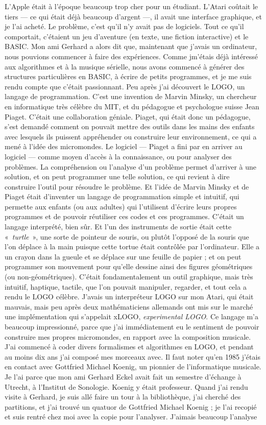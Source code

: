 \documentclass[a4paper,12pt]{article}
\newcommand{\guill}[1]{«~#1~»}
\begin{document}
L'Apple était à l'époque beaucoup trop cher pour un étudiant. L'Atari coûtait le tiers --- ce qui était déjà beaucoup d'argent ---, il avait une interface graphique, et je l'ai acheté. Le problème, c'est qu'il n'y avait pas de logiciels. Tout ce qu'il comportait, c'étaient un jeu d'aventure (en texte, une fiction interactive) et le BASIC. Mon ami Gerhard a alors dit que, maintenant que j'avais un ordinateur, nous pouvions commencer à faire des expériences. Comme jm'étais déjà intéressé aux algorithmes et à la musique sérielle, nous avons commencé à générer des structures particulières en BASIC, à écrire de petits programmes, et je me suis rendu compte que c'était passionnant. Peu après j'ai découvert le LOGO, un langage de programmation. C'est une invention de Marvin Minsky, un chercheur en informatique très célèbre du MIT, et du pédagogue et psychologue suisse Jean Piaget. C'était une collaboration géniale. Piaget, qui était donc un pédagogue, s'est demandé comment on pouvait mettre des outils dans les mains des enfants avec lesquels ils puissent appréhender ou construire leur environnement, ce qui a mené à l'idée des micromondes. Le logiciel --- Piaget a fini par en arriver au logiciel --- comme moyen d'accès à la connaissance, ou pour analyser des problèmes. La compréhension ou l'analyse d'un problème permet d'arriver à une solution, et on peut programmer une telle solution, ce qui revient à dire construire l'outil pour résoudre le problème. Et l'idée de Marvin Minsky et de Piaget était d'inventer un langage de programmation simple et intuitif, qui permette aux enfants (ou aux adultes) qui l'utilisent d'écrire leurs propres programmes et de pouvoir réutiliser ces codes et ces programmes. C'était un langage interprété, bien sûr. Et l'un des instruments de sortie était cette \guill{\emph{turtle}}, une sorte de pointeur de souris, ou plutôt l'opposé de la souris que l'on déplace à la main puisque cette tortue était contrôlée par l'ordinateur. Elle a un crayon dans la gueule et se déplace sur une feuille de papier ; et on peut programmer son mouvement pour qu'elle dessine ainsi des figures géométriques (ou non-géométriques). C'était fondamentalement un outil graphique, mais très intuitif, haptique, tactile, que l'on pouvait manipuler, regarder, et tout cela a rendu le LOGO célèbre. J'avais un interpréteur LOGO sur mon Atari, qui était mauvais, mais peu après deux mathématiciens allemands ont mis sur le marché une implémentation qui s'appelait xLOGO, \emph{experimental LOGO}. Ce langage m'a beaucoup impressionné, parce que j'ai immédiatement eu le sentiment de pouvoir construire mes propres micromondes, en rapport avec la composition musicale. J'ai commencé à coder divers formalismes et algorithmes en LOGO, et pendant au moins dix ans j'ai composé mes morceaux avec. Il faut noter qu'en 1985 j'étais en contact avec Gottfried Michael Koenig, un pionnier de l'informatique musicale. Je l'ai parce que mon ami Gerhard Eckel avait fait un semestre d'échange à Utrecht, à l'Institut de Sonologie. Koenig y était professeur. Quand j'ai rendu visite à Gerhard, je suis allé faire un tour à la bibliothèque, j'ai cherché des partitions, et j'ai trouvé un quatuor de Gottfried Michael Koenig ; je l'ai recopié et suis rentré chez moi avec la copie pour l'analyser. J'aimais beaucoup l'analyse 
\end{document}
